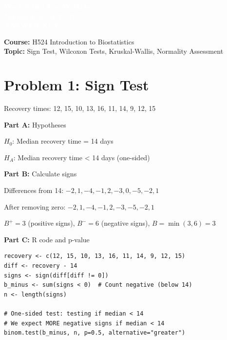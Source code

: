 \documentclass[11pt]{article}
\title{}
\author{}
\date{}
\begin{document}
\begin{tcolorbox}[colback=osaorange,colframe=black,boxrule=2pt,arc=0pt,left=6pt,right=6pt,top=10pt,bottom=10pt]
\centering
\textcolor{white}{\textbf{\Large Week 7 In-Class Worksheet}}\\
\textcolor{white}{\textbf{\large Nonparametric Tests}}\\
\textcolor{white}{\textbf{ANSWER KEY}}
\end{tcolorbox}

\vspace{8pt}

\noindent\textbf{Course:} H524 Introduction to Biostatistics\\
\textbf{Topic:} Sign Test, Wilcoxon Tests, Kruskal-Wallis, Normality Assessment

\vspace{12pt}

\section{Problem 1: Sign Test}

Recovery times: 12, 15, 10, 13, 16, 11, 14, 9, 12, 15

\vspace{6pt}

\textbf{Part A:} Hypotheses

$H_0$: Median recovery time = 14 days

$H_A$: Median recovery time < 14 days (one-sided)

\vspace{6pt}

\textbf{Part B:} Calculate signs

Differences from 14: $-2, 1, -4, -1, 2, -3, 0, -5, -2, 1$

After removing zero: $-2, 1, -4, -1, 2, -3, -5, -2, 1$

$B^+ = 3$ (positive signs), $B^- = 6$ (negative signs), $B = \min(3, 6) = 3$

\vspace{6pt}

\textbf{Part C:} R code and p-value

\begin{lstlisting}
recovery <- c(12, 15, 10, 13, 16, 11, 14, 9, 12, 15)
diff <- recovery - 14
signs <- sign(diff[diff != 0])
b_minus <- sum(signs < 0)  # Count negative (below 14)
n <- length(signs)

# One-sided test: testing if median < 14
# We expect MORE negative signs if median < 14
binom.test(b_minus, n, p=0.5, alternative="greater")
\end{lstlisting}
\end{document}
